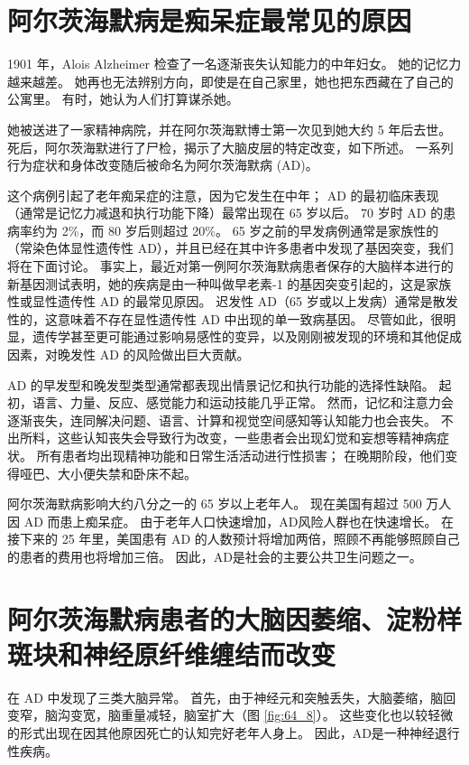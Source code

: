 \section{阿尔茨海默病是痴呆症最常见的原因}

1901 年，Alois Alzheimer 检查了一名逐渐丧失认知能力的中年妇女。
她的记忆力越来越差。
她再也无法辨别方向，即使是在自己家里，她也把东西藏在了自己的公寓里。
有时，她认为人们打算谋杀她。


她被送进了一家精神病院，并在阿尔茨海默博士第一次见到她大约 5 年后去世。
死后，阿尔茨海默进行了尸检，揭示了大脑皮层的特定改变，如下所述。
一系列行为症状和身体改变随后被命名为阿尔茨海默病 (AD)。


这个病例引起了老年痴呆症的注意，因为它发生在中年； AD 的最初临床表现（通常是记忆力减退和执行功能下降）最常出现在 65 岁以后。
70 岁时 AD 的患病率约为 2\%，而 80 岁后则超过 20\%。
65 岁之前的早发病例通常是家族性的（常染色体显性遗传性 AD），并且已经在其中许多患者中发现了基因突变，我们将在下面讨论。
事实上，最近对第一例阿尔茨海默病患者保存的大脑样本进行的新基因测试表明，她的疾病是由一种叫做早老素-1 的基因突变引起的，这是家族性或显性遗传性 AD 的最常见原因。
迟发性 AD（65 岁或以上发病）通常是散发性的，这意味着不存在显性遗传性 AD 中出现的单一致病基因。
尽管如此，很明显，遗传学甚至更可能通过影响易感性的变异，以及刚刚被发现的环境和其他促成因素，对晚发性 AD 的风险做出巨大贡献。


AD 的早发型和晚发型类型通常都表现出情景记忆和执行功能的选择性缺陷。
起初，语言、力量、反应、感觉能力和运动技能几乎正常。
然而，记忆和注意力会逐渐丧失，连同解决问题、语言、计算和视觉空间感知等认知能力也会丧失。
不出所料，这些认知丧失会导致行为改变，一些患者会出现幻觉和妄想等精神病症状。
所有患者均出现精神功能和日常生活活动进行性损害；
在晚期阶段，他们变得哑巴、大小便失禁和卧床不起。


阿尔茨海默病影响大约八分之一的 65 岁以上老年人。 现在美国有超过 500 万人因 AD 而患上痴呆症。
由于老年人口快速增加，AD风险人群也在快速增长。
在接下来的 25 年里，美国患有 AD 的人数预计将增加两倍，照顾不再能够照顾自己的患者的费用也将增加三倍。
因此，AD是社会的主要公共卫生问题之一。



\section{阿尔茨海默病患者的大脑因萎缩、淀粉样斑块和神经原纤维缠结而改变}

在 AD 中发现了三类大脑异常。
首先，由于神经元和突触丢失，大脑萎缩，脑回变窄，脑沟变宽，脑重量减轻，脑室扩大（图 \ref{fig:64_8}）。
这些变化也以较轻微的形式出现在因其他原因死亡的认知完好老年人身上。
因此，AD是一种神经退行性疾病。


